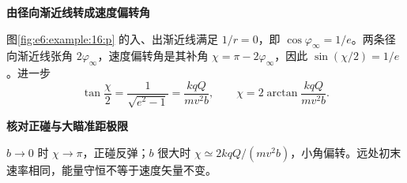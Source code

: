 \begin{solution}
{\begin{tikzpicture}
\end{tikzpicture}}



\par\medskip{}\noindent\textbf{由径向渐近线转成速度偏转角}\par\nobreak
图\ref{fig:e6:example:16:p} 的入、出渐近线满足 $1/r=0$，即 $\cos\varphi_\infty=1/e$。两条径向渐近线张角 $2\varphi_\infty$，速度偏转角是其补角 $\chi=\pi-2\varphi_\infty$，因此 $\sin(\chi/2)=1/e$。进一步
\[
 \tan\frac\chi2=\frac1{\sqrt{e^2-1}}
 =\frac{kqQ}{mv^2b},\qquad
 \chi=2\arctan\frac{kqQ}{mv^2b}.
\]


\par\medskip{}\noindent\textbf{核对正碰与大瞄准距极限}\par\nobreak
$b\to0$ 时 $\chi\to\pi$，正碰反弹；$b$ 很大时 $\chi\simeq2kqQ/(mv^2b)$，小角偏转。远处初末速率相同，能量守恒不等于速度矢量不变。\end{solution}
